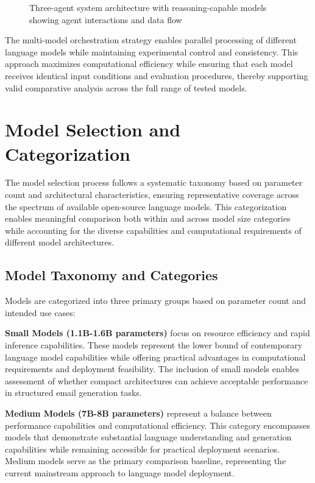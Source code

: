 \begin{figure}[htbp]
    \centering
    \caption{Three-agent system architecture with reasoning-capable models showing agent interactions and data flow}
    \label{fig:system-architecture}
\end{figure}

The multi-model orchestration strategy enables parallel processing of different language models while maintaining experimental control and consistency. This approach maximizes computational efficiency while ensuring that each model receives identical input conditions and evaluation procedures, thereby supporting valid comparative analysis across the full range of tested models.

\section{Model Selection and Categorization}
\label{sec:model-selection}

The model selection process follows a systematic taxonomy based on parameter count and architectural characteristics, ensuring representative coverage across the spectrum of available open-source language models. This categorization enables meaningful comparison both within and across model size categories while accounting for the diverse capabilities and computational requirements of different model architectures.

\subsection{Model Taxonomy and Categories}

Models are categorized into three primary groups based on parameter count and intended use cases:

\textbf{Small Models (1.1B-1.6B parameters)} focus on resource efficiency and rapid inference capabilities. These models represent the lower bound of contemporary language model capabilities while offering practical advantages in computational requirements and deployment feasibility. The inclusion of small models enables assessment of whether compact architectures can achieve acceptable performance in structured email generation tasks.

\textbf{Medium Models (7B-8B parameters)} represent a balance between performance capabilities and computational efficiency. This category encompasses models that demonstrate substantial language understanding and generation capabilities while remaining accessible for practical deployment scenarios. Medium models serve as the primary comparison baseline, representing the current mainstream approach to language model deployment.

